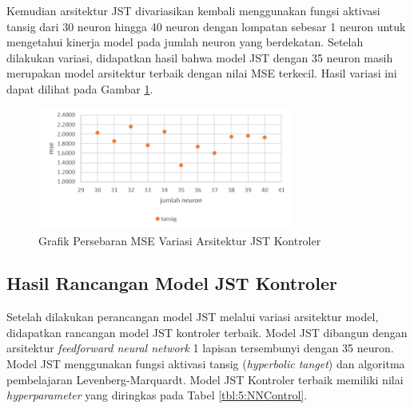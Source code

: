 Kemudian arsitektur JST divariasikan kembali menggunakan fungsi aktivasi tansig dari 30 neuron hingga 40 neuron dengan lompatan sebesar 1 neuron untuk mengetahui kinerja model pada jumlah neuron yang berdekatan. Setelah dilakukan variasi, didapatkan hasil bahwa model JST dengan 35 neuron masih merupakan model arsitektur terbaik dengan nilai MSE terkecil. Hasil variasi ini dapat dilihat pada Gambar \ref{fig:5:NeuronVariation}.

\begin{figure}[!h]
	\centering
	\includegraphics[width=0.75\textwidth]{figures/NeuronVariation}
	\caption{Grafik Persebaran MSE Variasi Arsitektur JST Kontroler}
	\label{fig:5:NeuronVariation}
\end{figure}

\subsection{Hasil Rancangan Model JST Kontroler}

Setelah dilakukan perancangan model JST melalui variasi arsitektur model, didapatkan rancangan model JST kontroler terbaik. Model JST dibangun dengan arsitektur \textit{feedforward neural network} 1 lapisan tersembunyi dengan 35 neuron. Model JST menggunakan fungsi aktivasi tansig (\textit{hyperbolic tanget}) dan algoritma pembelajaran Levenberg-Marquardt. Model JST Kontroler terbaik memiliki nilai \textit{hyperparameter} yang diringkas pada Tabel \ref{tbl:5:NNControl}.
 
